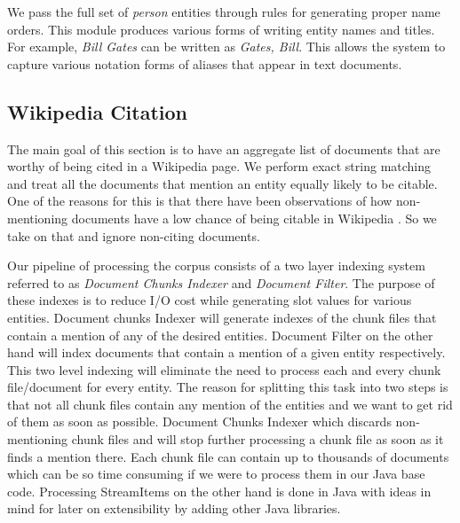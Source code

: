 We pass the full set of \textit{person} entities through rules for generating proper name orders.
This module produces various forms of writing entity names and titles.
For example, \textsl{Bill Gates} can be written as \textsl{Gates, Bill}.
This allows the system to capture various notation forms of aliases that appear in text documents.

\subsection{Wikipedia Citation}
The main goal of this section is to have an aggregate list of documents that are worthy of being cited in a Wikipedia page. We perform exact string matching and treat all the documents that mention an entity equally likely to be citable. One of the reasons for this is that there have been observations of how non-mentioning documents have a low chance of being citable in Wikipedia \cite{JFrank12}. So we take on that and ignore non-citing documents. 

Our pipeline of processing the corpus consists of a two layer indexing system referred to as \textit{Document Chunks Indexer} and \textit{Document Filter}. The purpose of these indexes is to reduce I/O cost while generating slot values for various entities. Document chunks Indexer will generate indexes of the chunk files that contain a mention of any of the desired entities. Document Filter on the other hand will index documents that contain a mention of a given entity respectively. This two level indexing will eliminate the need to process each and every chunk file/document for every entity. The reason for splitting this task into two steps is that not all chunk files contain any mention of the entities and we want to get rid of them as soon as possible. Document Chunks Indexer which discards non-mentioning chunk files and will stop further processing a chunk file as soon as it finds a mention there. Each chunk file can contain up to thousands of documents which can be so time consuming if we were to process them in our Java base code. Processing StreamItems on the other hand is done in Java with ideas in mind for later on extensibility by adding other Java libraries.







